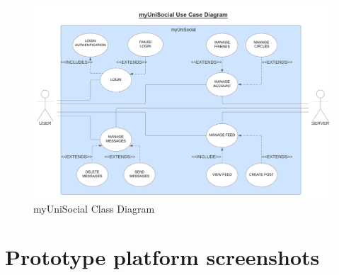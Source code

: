 \documentclass[lettersize,journal]{IEEEtran}
\begin{document}
\begin{figure}[h!]
                \includegraphics[width=0.85\paperwidth]{images/myUniSocialUseCaseDiagram.png}
                \caption{myUniSocial Class Diagram}
                \label{figure 3}
\end{figure}
\clearpage
\newpage

\section{Prototype platform screenshots}
\end{document}
